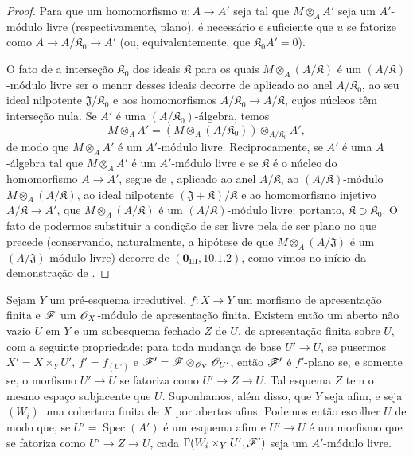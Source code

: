 
\begin{proof}
Para que um homomorfismo
$u:A\to A'$ seja tal que
$M\otimes_A A'$ seja um
$A'$-módulo livre
(respectivamente, plano), é
necessário e suficiente que
$u$ se fatorize como
$A\to A/\mathfrak K_0\to A'$
(ou, equivalentemente, que
$\mathfrak K_0A'=0$).

O fato de a interseção
$\mathfrak K_0$ dos ideais
$\mathfrak K$ para os quais
$M\otimes_A(A/\mathfrak K)$
é um $(A/\mathfrak K)$-módulo
livre ser o menor desses ideais
decorre de 
aplicado ao anel
$A/\mathfrak K_0$, ao seu ideal
nilpotente
$\mathfrak J/\mathfrak K_0$
e aos homomorfismos
$A/\mathfrak K_0\to
A/\mathfrak K$, cujos núcleos
têm interseção nula.
Se $A'$ é uma
$(A/\mathfrak K_0)$-álgebra,
temos
\[
M\otimes_A A'
=
(M\otimes_A(A/\mathfrak K_0))
\otimes_{A/\mathfrak K_0}A',
\]
de modo que $M\otimes_A A'$
é um $A'$-módulo livre.
Reciprocamente, se $A'$ é
uma $A$-álgebra tal que
$M\otimes_A A'$ é um
$A'$-módulo livre e se
$\mathfrak K$ é o núcleo do
homomorfismo $A\to A'$, segue
de , aplicado
ao anel $A/\mathfrak K$, ao
$(A/\mathfrak K)$-módulo
$M\otimes_A(A/\mathfrak K)$,
ao ideal nilpotente
$(\mathfrak J+\mathfrak K)/
\mathfrak K$ e ao homomorfismo
injetivo $A/\mathfrak K\to A'$,
que
$M\otimes_A(A/\mathfrak K)$
é um $(A/\mathfrak K)$-módulo
livre; portanto,
$\mathfrak K\supset
\mathfrak K_0$.
O fato de podermos substituir
a condição de ser livre pela
de ser plano no que precede
(conservando, naturalmente, a
hipótese de que
$M\otimes_A(A/\mathfrak J)$
é um $(A/\mathfrak J)$-módulo
livre) decorre de
$(\mathbf 0_{\mathrm{III}},10.1.2)$,
como vimos no início da
demonstração de
.
\end{proof}

\begin{proposition}[11.4.5]
\label{IV.11.4.5}
Sejam $Y$ um pré-esquema
irredutível,
$f:X\to Y$ um morfismo de
apresentação finita e
$\mathscr{F}$ um
$\mathscr{O}_X$-módulo de
apresentação finita.
Existem então um aberto não
vazio $U$ em $Y$ e um
subesquema fechado $Z$ de
$U$, de apresentação finita
sobre $U$, com a seguinte
propriedade: para toda
mudança de base $U'\to U$,
se pusermos
$X'=X\times_YU'$,
$f'=f_{(U')}$ e
$\mathscr{F}'=\mathscr{F}
\otimes_{\mathscr{O}_Y}\mathscr{O}_{U'}$,
então $\mathscr{F}'$ é
$f'$-plano se, e somente se,
o morfismo $U'\to U$ se
fatoriza como
$U'\to Z\to U$.
Tal esquema $Z$ tem o mesmo
espaço subjacente que $U$.
Suponhamos, além disso, que
$Y$ seja afim, e seja
$(W_i)$ uma cobertura finita
de $X$ por abertos afins.
Podemos então escolher $U$ de
modo que, se
$U'=\operatorname{Spec}(A')$
é um esquema afim e $U'\to U$
é um morfismo que se
fatoriza como $U'\to Z\to U$,
cada
$\Gamma(W_i\times_YU',\mathscr{F}')$
seja um $A'$-módulo livre.
\end{proposition}

